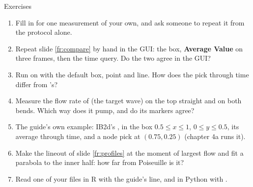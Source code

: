 \documentclass[aspectratio=169,11pt]{beamer}
\newcommand{\gui}[1]{\textsf{\textbf{#1}}}
\begin{document}
\begin{frame}{Exercises}
\label{fr:exercises}
\footnotesize
\begin{enumerate}
  \item Fill in  for one measurement of your own, and ask someone to repeat it from the protocol alone.
  \item Repeat slide \ref{fr:compare} by hand in the GUI: the box, \gui{Average Value} on three frames, then the time query. Do the two agree in the GUI?
  \item Run  on  with the default box, point and line. How does the pick through time differ from 's?
  \item Measure the flow rate of  (the target wave) on the top straight and on both bends. Which way does it pump, and do its markers agree?
  \item The guide's own example: IB2d's ,  in the box $0.5 \le x \le 1$, $0 \le y \le 0.5$, its average through time, and a node pick at $(0.75, 0.25)$ (chapter 4a runs it).
  \item Make the lineout of slide \ref{fr:profiles} at the moment of largest flow and fit a parabola to the inner half: how far from Poiseuille is it?
  \item Read one of your  files in R with the guide's  line, and in Python with .
\end{enumerate}
\end{frame}
\end{document}
